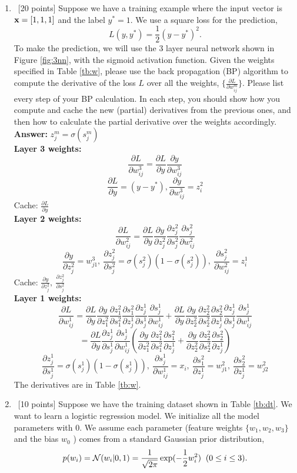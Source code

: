 \documentclass[12pt, fullpage,letterpaper]{article}
\newcommand{\Answer}{{\\\textbf{Answer: }}}
\newcommand{\pd}[2]{\frac{\partial #1}{\partial #2}}
\begin{document}
\begin{enumerate}
	\item~[20 points] Suppose we have a training example  where the input vector is ${\bf x} = [1,1,1]$ and the label $y^* = 1$. We use a square loss for the prediction, 
	\[
	L(y, y^*) = \frac{1}{2}(y-y^*)^2.
	\]
	To make the prediction, we will use the 3 layer neural network shown in Figure \ref{fig:3nn}, with the sigmoid activation function. Given the weights specified in Table \ref{tb:w}, please use the back propagation (BP) algorithm to compute the derivative of the loss $L$ over all the weights, $\{\frac{\partial L}{\partial w^{m}_{ij}}\}$. Please list every step of your BP calculation. In each step, you should show how you compute and cache the new (partial) derivatives from the previous ones, and then how to calculate the partial derivative over the weights accordingly.  
	\Answer$z^m_j = \sigma(s^m_j)$\\
	\textbf{Layer 3 weights:}
	\[\pd{L}{w^3_{ij}} = \pd{L}{y}\pd{y}{w^3_{ij}}\]
	\[\pd{L}{y} = (y-y^*),\pd{y}{w^3_{ij}} = z^2_i\]
	Cache: $\pd{L}{y}$\\
	\textbf{Layer 2 weights:}
	\[\pd{L}{w^2_{ij}} = \pd{L}{y}\pd{y}{z^2_j}\pd{z^2_j}{s^2_j}\pd{s^2_j}{w^2_{ij}}\]
	\[\pd{y}{z^2_j} = w^3_{j1}, ~ \pd{z^2_j}{s^2_j} = \sigma(s^2_j)(1 - \sigma(s^2_j)), ~ \pd{s^2_j}{w^2_{ij}} = z^1_i\]
	Cache: $\pd{y}{z^2_j}, ~ \pd{z^2_j}{s^2_j} $\\
	\textbf{Layer 1 weights:}
	\[\pd{L}{w^1_{ij}} = \pd{L}{y}\pd{y}{z^2_1}\pd{z^2_1}{s^2_1}\pd{s^2_1}{z^1_j}\pd{z^1_j}{s^1_j}\pd{s^1_j}{w^1_{ij}} + \pd{L}{y}\pd{y}{z^2_2}\pd{z^2_2}{s^2_2}\pd{s^2_2}{z^1_j}\pd{z^1_j}{s^1_j}\pd{s^1_j}{w^1_{ij}}\]
	\[= \pd{L}{y}\pd{z^1_j}{s^1_j}\pd{s^1_j}{w^1_{ij}} \left(\pd{y}{z^2_1}\pd{z^2_1}{s^2_1}\pd{s^2_1}{z^1_j} + \pd{y}{z^2_2}\pd{z^2_2}{s^2_2}\pd{s^2_2}{z^1_j}\right)\]
	\[\pd{z^1_j}{s^1_j} = \sigma(s^1_j)(1 - \sigma(s^1_j)), ~ \pd{s^1_j}{w^1_{ij}} = x_i, ~ \pd{s^2_1}{z^1_j} = w^2_{j1}, ~ \pd{s^2_2}{z^1_j} = w^2_{j2}\]
	The derivatives are in Table \ref{tb:w}.
	\item~[10 points] Suppose we have the training dataset shown in Table \ref{tb:dt}. We want to learn a logistic regression model. We initialize all the model parameters with $0$.  We assume each parameter (\ie feature weights $\{w_1, w_2, w_3\}$ and the bias $w_0$ ) comes from a standard Gaussian prior distribution, 
	\[
	p(w_i) = \mathcal{N}(w_i|0,1) = \frac{1}{\sqrt{2\pi}}\exp(-\frac{1}{2}w_i^2)\;\;(0\le i\le 3).
	\]
	

\end{enumerate}
\end{document}
